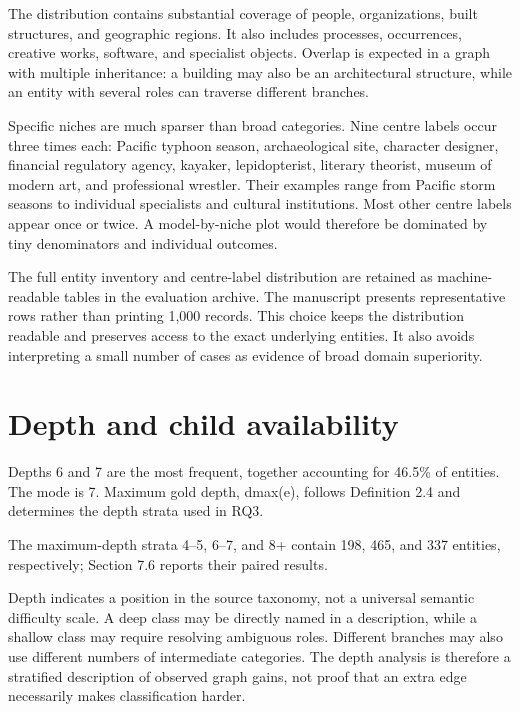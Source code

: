 The distribution contains substantial coverage of people, organizations, built structures, and geographic regions. It also includes processes, occurrences, creative works, software, and specialist objects. Overlap is expected in a graph with multiple inheritance: a building may also be an architectural structure, while an entity with several roles can traverse different branches.


Specific niches are much sparser than broad categories. Nine centre labels occur three times each: Pacific typhoon season, archaeological site, character designer, financial regulatory agency, kayaker, lepidopterist, literary theorist, museum of modern art, and professional wrestler. Their examples range from Pacific storm seasons to individual specialists and cultural institutions. Most other centre labels appear once or twice. A model-by-niche plot would therefore be dominated by tiny denominators and individual outcomes.


The full entity inventory and centre-label distribution are retained as machine-readable tables in the evaluation archive. The manuscript presents representative rows rather than printing 1,000 records. This choice keeps the distribution readable and preserves access to the exact underlying entities. It also avoids interpreting a small number of cases as evidence of broad domain superiority.


\FloatBarrier

\section{Depth and child availability}

Depths 6 and 7 are the most frequent, together accounting for 46.5\% of entities. The mode is 7. Maximum gold depth, dmax(e), follows Definition 2.4 and determines the depth strata used in RQ3.


The maximum-depth strata 4–5, 6–7, and 8+ contain 198, 465, and 337 entities, respectively; Section 7.6 reports their paired results.


Depth indicates a position in the source taxonomy, not a universal semantic difficulty scale. A deep class may be directly named in a description, while a shallow class may require resolving ambiguous roles. Different branches may also use different numbers of intermediate categories. The depth analysis is therefore a stratified description of observed graph gains, not proof that an extra edge necessarily makes classification harder.



